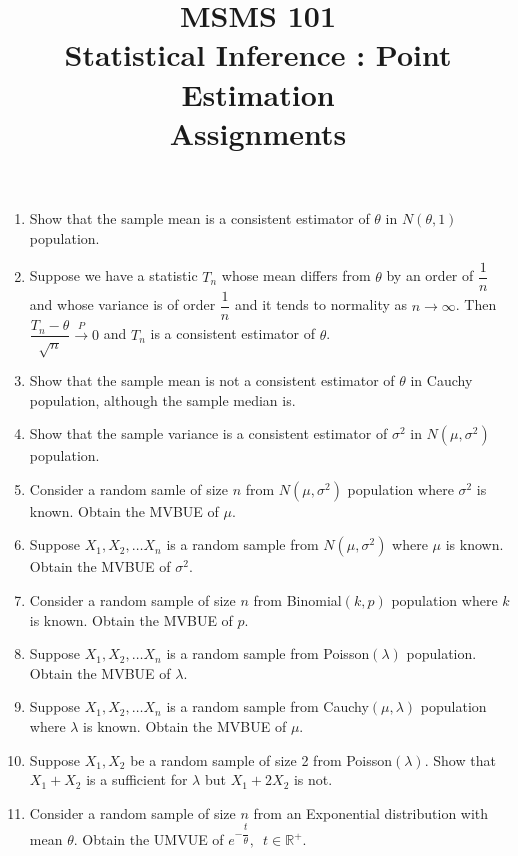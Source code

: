 \documentclass[11pt, a4paper]{article}
\title{MSMS 101 \\ Statistical Inference : Point Estimation \\ \vspace{0.3cm} \textbf{Assignments}}
\author{}
\date{}
\begin{document}
\maketitle


\begin{enumerate}

\item Show that the sample mean is a consistent estimator of $\theta$ in $N(\theta, 1)$ population.

\item Suppose we have a statistic $T_n$ whose mean differs from $\theta$ by an order of $\dfrac{1}{n}$ and whose variance is of order $\dfrac{1}{n}$ and it tends to normality as $n \rightarrow \infty$. Then $\dfrac{T_n - \theta}{\sqrt{n}} \xrightarrow{P} 0$ and $T_n$ is a consistent estimator of $\theta$.

\item Show that the sample mean is not a consistent estimator of $\theta$ in Cauchy population, although the sample median is.

\item Show that the sample variance is a consistent estimator of $\sigma^2$ in $N(\mu, \sigma^2)$ population.

\item Consider a random samle of size $n$ from $N(\mu, \sigma^2)$ population where $\sigma^2$ is known. Obtain the MVBUE of $\mu$.

\item Suppose $X_1, X_2, \ldots X_n$ is a random sample from $N(\mu, \sigma^2)$ where $\mu$ is known. Obtain the MVBUE of $\sigma^2$.

\item Consider a random sample of size $n$ from Binomial$(k, p)$ population where $k$ is known. Obtain the MVBUE of $p$.

\item Suppose $X_1, X_2, \ldots X_n$ is a random sample from Poisson$(\lambda)$ population. Obtain the MVBUE of $\lambda$.

\item Suppose $X_1, X_2, \ldots X_n$ is a random sample from Cauchy$(\mu, \lambda)$ population where $\lambda$ is known. Obtain the MVBUE of $\mu$.

\item Suppose $X_1, X_2$ be a random sample of size 2 from Poisson$(\lambda)$. Show that $X_1 + X_2$ is a sufficient for $\lambda$ but $X_1 + 2X_2$ is not.

\item Consider a random sample of size $n$ from an Exponential distribution with mean $\theta$. Obtain the UMVUE of $e^{-\dfrac{t}{\theta}}, \,\,\, t \in \mathbb{R^+}$.


\end{enumerate}
\end{document}
